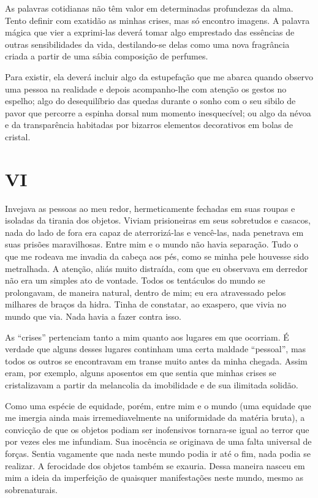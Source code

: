 As palavras cotidianas não têm valor em determinadas profundezas da alma. Tento definir com exatidão as minhas crises, mas só encontro imagens. A palavra mágica que vier a exprimi-las deverá tomar algo emprestado das essências de outras sensibilidades da vida, destilando-se delas como uma nova fragrância criada a partir de uma sábia composição de perfumes.

Para existir, ela deverá incluir algo da estupefação que me abarca quando observo uma pessoa na realidade e depois acompanho-lhe com atenção os gestos no espelho; algo do desequilíbrio das quedas durante o sonho com o seu sibilo de pavor que percorre a espinha dorsal num momento inesquecível; ou algo da névoa e da transparência habitadas por bizarros elementos decorativos em bolas de cristal.


\chapter*{\centering\Large{VI}}

Invejava as pessoas ao meu redor, hermeticamente fechadas em suas roupas e isoladas da tirania dos objetos. Viviam prisioneiras em seus sobretudos e casacos, nada do lado de fora era capaz de aterrorizá-las e vencê-las, nada penetrava em suas prisões maravilhosas. Entre mim e o mundo não havia separação. Tudo o que me rodeava me invadia da cabeça aos pés, como se minha pele houvesse sido metralhada. A atenção, aliás muito distraída, com que eu observava em derredor não era um simples ato de vontade. Todos os tentáculos do mundo se prolongavam, de maneira natural, dentro de mim; eu era atravessado pelos milhares de braços da hidra. Tinha de constatar, ao exaspero, que vivia no mundo que via. Nada havia a fazer contra isso.

As ``crises'' pertenciam tanto a mim quanto aos lugares em que ocorriam. É verdade que alguns desses lugares continham uma certa maldade ``pessoal'', mas todos os outros se encontravam em transe muito antes da minha chegada. Assim eram, por exemplo, alguns aposentos em que sentia que minhas crises se cristalizavam a partir da melancolia da imobilidade e de sua ilimitada solidão.

Como uma espécie de equidade, porém, entre mim e o mundo (uma equidade que me imergia ainda mais irremediavelmente na uniformidade da matéria bruta), a convicção de que os objetos podiam ser inofensivos tornara-se igual ao terror que por vezes eles me infundiam. Sua inocência se originava de uma falta universal de forças.
Sentia vagamente que nada neste mundo podia ir até o fim, nada podia se realizar. A ferocidade dos objetos também se exauria. Dessa maneira nasceu em mim a ideia da imperfeição de quaisquer manifestações neste mundo, mesmo as sobrenaturais. 

